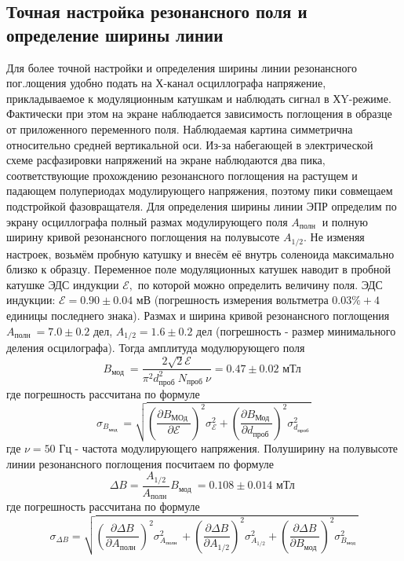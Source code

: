 \documentclass[a4paper, 12pt]{article}%
\begin{document}
\subsection*{Точная настройка резонансного поля и определение ширины линии}
Для более точной настройки и определения ширины линии резонансного пог.лощения удобно подать на Х-канал осциллографа напряжение, прикладываемое к модуляционным катушкам и наблюдать сигнал в ХY-режиме. Фактически при этом на экране наблюдается
зависимость поглощения в образце от приложенного переменного поля. Наблюдаемая картина симметрична относительно средней вертикальной оси. Из-за набегающей в электрической схеме расфазировки напряжений на экране наблюдаются два пика, соответствующие прохождению резонансного поглощения на растущем и падающем полупериодах модулирующего напряжения, поэтому пики совмещаем подстройкой фазовращателя. Для определения ширины линии ЭПР определим по экрану осциллографа полный размах модулирующего поля $A_{\text {полн }}$ и полную ширину кривой резонансного поглощения на полувысоте $A_{1 / 2}$. Не изменяя настроек, возьмём пробную катушку и внесём её внутрь соленоида максимально близко к образцу. Переменное поле модуляционных катушек наводит в пробной катушке ЭДС индукции $\mathcal{E},$ по которой можно определить величину поля. ЭДС индукции: $\mathcal{E}=0.90 \pm 0.04$ мВ (погрешность измерения вольтметра $0.03 \%+4$ единицы последнего знака). Размах и ширина кривой резонансного поглощения $A_{\text {полн }}=7.0 \pm 0.2$ дел, $A_{1 / 2}=1.6 \pm 0.2$ дел (погрешность - размер минимального деления осцилографа). Тогда амплитуда модулюрующего поля
$$
B_{\text {мод }}=\frac{2 \sqrt{2} \mathcal{E}}{\pi^{2} d_{\text {проб }}^{2} N_{\text {проб }} \nu}=0.47 \pm 0.02 \text { мТл }
$$
где погрешность рассчитана по формуле
$$
\sigma_{B_{\text {мод }}}=\sqrt{\left(\frac{\partial B_{\text {МОд }}}{\partial \mathcal{E}}\right)^{2} \sigma_{\mathcal{E}}^{2}+\left(\frac{\partial B_{\text {Мод }}}{\partial d_{\text {проб }}}\right)^{2} \sigma_{d_{\text {проб }}}^{2}}
$$
где $\nu=50$ Гц - частота модулирующего напряжения. Полуширину на полувысоте линии резонансного поглощения посчитаем по формуле
$$
\Delta B=\frac{A_{1 / 2}}{A_{\text {полн }}} B_{\text {мод }}=0.108 \pm 0.014 \text { мТл }
$$
где погрешность рассчитана по формуле
$$
\sigma_{\Delta B}=\sqrt{\left(\frac{\partial \Delta B}{\partial A_{\text {полн }}}\right)^{2} \sigma_{A_{\text {полн }}}^{2}+\left(\frac{\partial \Delta B}{\partial A_{1 / 2}}\right)^{2} \sigma_{A_{1 / 2}}^{2}+\left(\frac{\partial \Delta B}{\partial B_{\text {мод }}}\right)^{2} \sigma_{B_{\text {мод }}}^{2}}
$$
\end{document}
